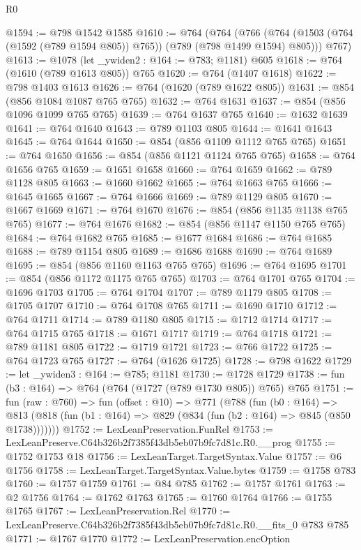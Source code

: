\begin{lexlean}{R0}
\begin{coremodule}
@1594 := @798 @1542 @1585
@1610 := @764
    (@764
      (@766 (@764 (@1503 (@764 (@1592 (@789 @1594 @805)) @765)) (@789 (@798 @1499 @1594) @805)))
      @767)
@1613 := @1078 (let _ywiden2 : @164 := @783; @1181) @605
@1618 := @764 (@1610 (@789 @1613 @805)) @765
@1620 := @764 (@1407 @1618)
@1622 := @798 @1403 @1613
@1626 := @764 (@1620 (@789 @1622 @805))
@1631 := @854 (@856 @1084 @1087 @765 @765)
@1632 := @764 @1631
@1637 := @854 (@856 @1096 @1099 @765 @765)
@1639 := @764 @1637 @765
@1640 := @1632 @1639
@1641 := @764 @1640
@1643 := @789 @1103 @805
@1644 := @1641 @1643
@1645 := @764 @1644
@1650 := @854 (@856 @1109 @1112 @765 @765)
@1651 := @764 @1650
@1656 := @854 (@856 @1121 @1124 @765 @765)
@1658 := @764 @1656 @765
@1659 := @1651 @1658
@1660 := @764 @1659
@1662 := @789 @1128 @805
@1663 := @1660 @1662
@1665 := @764 @1663 @765
@1666 := @1645 @1665
@1667 := @764 @1666
@1669 := @789 @1129 @805
@1670 := @1667 @1669
@1671 := @764 @1670
@1676 := @854 (@856 @1135 @1138 @765 @765)
@1677 := @764 @1676
@1682 := @854 (@856 @1147 @1150 @765 @765)
@1684 := @764 @1682 @765
@1685 := @1677 @1684
@1686 := @764 @1685
@1688 := @789 @1154 @805
@1689 := @1686 @1688
@1690 := @764 @1689
@1695 := @854 (@856 @1160 @1163 @765 @765)
@1696 := @764 @1695
@1701 := @854 (@856 @1172 @1175 @765 @765)
@1703 := @764 @1701 @765
@1704 := @1696 @1703
@1705 := @764 @1704
@1707 := @789 @1179 @805
@1708 := @1705 @1707
@1710 := @764 @1708 @765
@1711 := @1690 @1710
@1712 := @764 @1711
@1714 := @789 @1180 @805
@1715 := @1712 @1714
@1717 := @764 @1715 @765
@1718 := @1671 @1717
@1719 := @764 @1718
@1721 := @789 @1181 @805
@1722 := @1719 @1721
@1723 := @766 @1722
@1725 := @764 @1723 @765
@1727 := @764 (@1626 @1725)
@1728 := @798 @1622
@1729 := let _ywiden3 : @164 := @785; @1181
@1730 := @1728 @1729
@1738 := fun (b3 : @164) => @764 (@764 (@1727 (@789 @1730 @805)) @765) @765
@1751 := fun (raw : @760) =>
  fun (offset : @10) =>
  @771
    (@788
      (fun (b0 : @164) =>
      @813 (@818 (fun (b1 : @164) => @829 (@834 (fun (b2 : @164) => @845 (@850 @1738)))))))
@1752 := LexLeanPreservation.FunRel
@1753 := LexLeanPreserve.C64b326b2f7385f43db5eb07b9fc7d81c.R0.__prog
@1755 := @1752 @1753 @18
@1756 := LexLeanTarget.TargetSyntax.Value
@1757 := @6 @1756
@1758 := LexLeanTarget.TargetSyntax.Value.bytes
@1759 := @1758 @783
@1760 := @1757 @1759
@1761 := @84 @785
@1762 := @1757 @1761
@1763 := @2 @1756
@1764 := @1762 @1763
@1765 := @1760 @1764
@1766 := @1755 @1765
@1767 := LexLeanPreservation.Rel
@1770 := LexLeanPreserve.C64b326b2f7385f43db5eb07b9fc7d81c.R0.__fits_0 @783 @785
@1771 := @1767 @1770
@1772 := LexLeanPreservation.encOption

\end{coremodule}
\end{lexlean}
